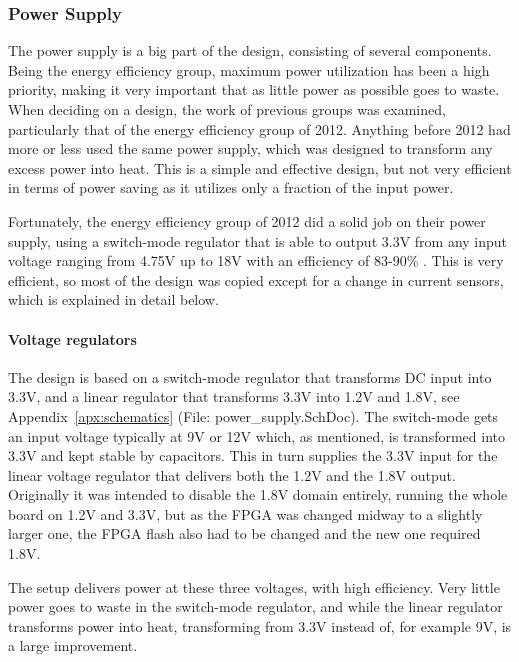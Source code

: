 
\subsubsection{Power Supply}

The power supply is a big part of the design, consisting of several components.
Being the energy efficiency group, maximum power utilization has been a high
priority, making it very important that as little power as possible goes to
waste. When deciding on a design, the work of previous groups was examined,
particularly that of the energy efficiency group of 2012. Anything before 2012
had more or less used the same power supply, which was designed to transform any
excess power into heat. This is a simple and effective design, but not very
efficient in terms of power saving as it utilizes only a fraction of the input
power.

Fortunately, the energy efficiency group of 2012 did a solid job on their power
supply, using a switch-mode regulator that is able to output 3.3V from any input
voltage ranging from 4.75V up to 18V with an efficiency of 83-90\% . This is very efficient, so most of the design
was copied except for a change in current sensors, which is explained in detail
below.

\paragraph{Voltage regulators}

The design is based on a switch-mode regulator that transforms DC input into
3.3V, and a linear regulator
that transforms 3.3V into 1.2V and 1.8V, see Appendix~\ref{apx:schematics}
(File: power\_supply.SchDoc). The switch-mode gets an input voltage typically at
9V or 12V which, as mentioned, is transformed into 3.3V and kept stable by
capacitors. This in turn supplies the 3.3V input for the linear voltage
regulator that delivers both the 1.2V and the 1.8V output. Originally it was
intended to disable the 1.8V domain entirely, running the whole board on 1.2V
and 3.3V, but as the FPGA was changed midway to a slightly larger one, the FPGA
flash also had to be changed and the new one required 1.8V.

The setup
delivers power at these three voltages, with high efficiency. Very little power
goes to waste in the switch-mode regulator, and while the linear regulator
transforms power into heat, transforming from 3.3V instead of, for example 9V,
is a large improvement.

